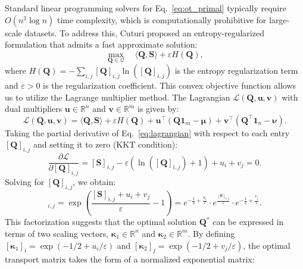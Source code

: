Standard linear programming solvers for Eq.~\eqref{eq:ot_primal} typically require $O(n^3 \log n)$ time complexity, which is computationally prohibitive for large-scale datasets. To address this, Cuturi \citep{sinkhorn} proposed an entropy-regularized formulation that admits a fast approximate solution:
\begin{equation}
    \max_{\mathbf{Q} \in \mathcal{Q}} \quad \langle \mathbf{Q}, \mathbf{S} \rangle + \varepsilon H(\mathbf{Q}),
    \label{eq:ot_regularized}
\end{equation}
where $H(\mathbf{Q}) = - \sum_{i,j} [\mathbf{Q}]_{i,j} \ln([\mathbf{Q}]_{i,j})$ is the entropy regularization term and $\varepsilon > 0$ is the regularization coefficient. This convex objective function allows us to utilize the Lagrange multiplier method. The Lagrangian $\mathcal{L}(\mathbf{Q}, \boldsymbol{u}, \boldsymbol{v})$ with dual multipliers $\boldsymbol{u} \in \mathbb{R}^n$ and $\boldsymbol{v} \in \mathbb{R}^m$ is given by:
\begin{equation}
    \mathcal{L}(\mathbf{Q}, \boldsymbol{u}, \boldsymbol{v}) = \langle \mathbf{Q}, \mathbf{S} \rangle + \varepsilon H(\mathbf{Q}) + \boldsymbol{u}^\top (\mathbf{Q}\mathbf{1}_m - \boldsymbol{\mu}) + \boldsymbol{v}^\top (\mathbf{Q}^\top \mathbf{1}_n - \boldsymbol{\nu}).
    \label{eq:lagrangian}
\end{equation}
Taking the partial derivative of Eq.~\eqref{eq:lagrangian} with respect to each entry $[\mathbf{Q}]_{i,j}$ and setting it to zero (KKT condition):
\begin{equation}
    \frac{\partial \mathcal{L}}{\partial [\mathbf{Q}]_{i,j}} = [\mathbf{S}]_{i,j} - \varepsilon (\ln([\mathbf{Q}]_{i,j}) + 1) + u_i + v_j = 0.
\end{equation}
Solving for $[\mathbf{Q}]_{i,j}$, we obtain:
\begin{equation}
    [\mathbf{Q}]_{i,j} = \exp\left( \frac{[\mathbf{S}]_{i,j} + u_i + v_j}{\varepsilon} - 1 \right) = e^{-\frac{1}{2} + \frac{u_i}{\varepsilon}} \cdot e^{\frac{[\mathbf{S}]_{i,j}}{\varepsilon}} \cdot e^{-\frac{1}{2} + \frac{v_j}{\varepsilon}}.
\end{equation}
This factorization suggests that the optimal solution $\mathbf{Q}^*$ can be expressed in terms of two scaling vectors, $\boldsymbol{\kappa}_1 \in \mathbb{R}^n$ and $\boldsymbol{\kappa}_2 \in \mathbb{R}^m$. By defining $\displaystyle[\boldsymbol{\kappa}_1]_i = \exp\left(-{1}/{2} + {u_i}/{\varepsilon}\right)$ and $\displaystyle[\boldsymbol{\kappa}_2]_j = \exp\left(-{1}/{2} + {v_j}/{\varepsilon}\right)$, the optimal transport matrix takes the form of a normalized exponential matrix:
